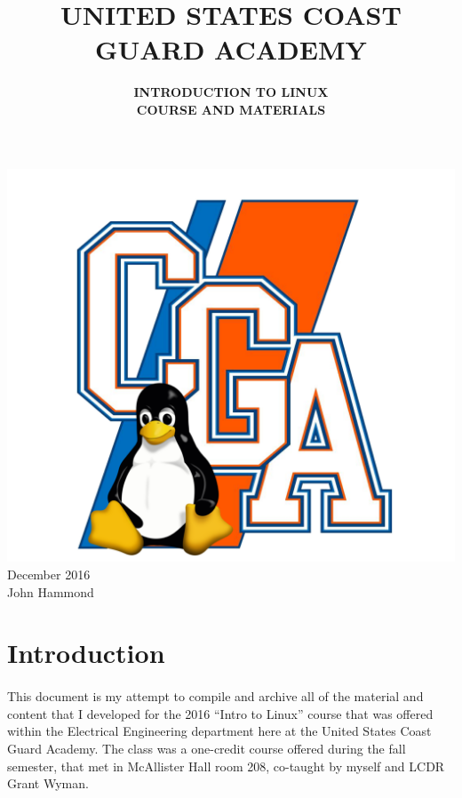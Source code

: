 \documentclass[11pt]{article}
\title{  {\bf UNITED STATES COAST GUARD ACADEMY } }
\author{ { \bf INTRODUCTION TO LINUX } \\ { \bf COURSE AND MATERIALS } }
\date{}
\begin{document}
	
	\maketitle

	\begin{center}
		\graphicspath{ {.} }
		\includegraphics[width=\textwidth,height=\textheight,keepaspectratio]{logo.png}
		\centering
		\vfill
		December 2016 \\
		John Hammond
	\end{center}

	\newpage

	\renewcommand*\contentsname{Table of Contents}
	\tableofcontents
	\vfill
	\hrulefill

	\newpage


	\section{Introduction}
	\label{Introduction}
	\paragraph{} This document is my attempt to compile and archive all of the material and content that I developed for the 2016 ``Intro to Linux'' course that was offered within the Electrical Engineering department here at the United States Coast Guard Academy. The class was a one-credit course offered during the fall semester, that met in McAllister Hall room 208, co-taught by myself and LCDR Grant Wyman.
\end{document}
